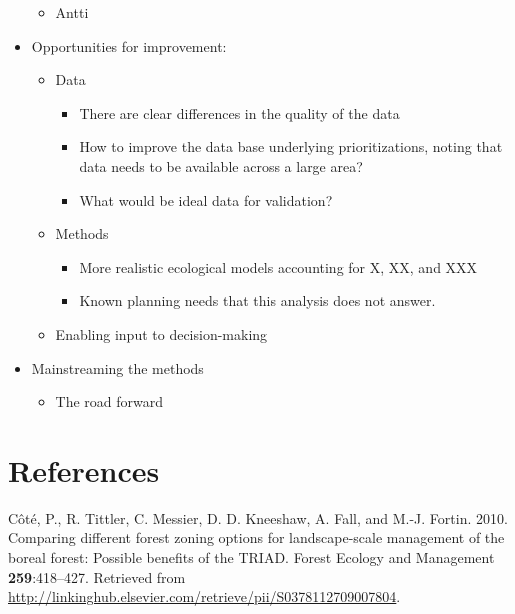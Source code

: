 \documentclass[]{article}
\begin{document}
\begin{itemize}
  \begin{itemize}
  \itemsep1pt\parskip0pt
  \item
    Antti
  \end{itemize}
\item
  Opportunities for improvement:

  \begin{itemize}
  \itemsep1pt\parskip0pt
  \item
    Data

    \begin{itemize}
    \itemsep1pt\parskip0pt
    \item
      There are clear differences in the quality of the data
    \item
      How to improve the data base underlying prioritizations, noting
      that data needs to be available across a large area?
    \item
      What would be ideal data for validation?
    \end{itemize}
  \item
    Methods

    \begin{itemize}
    \itemsep1pt\parskip0pt
    \item
      More realistic ecological models accounting for X, XX, and XXX
    \item
      Known planning needs that this analysis does not answer.
    \end{itemize}
  \item
    Enabling input to decision-making
  \end{itemize}
\item
  Mainstreaming the methods

  \begin{itemize}
  \itemsep1pt\parskip0pt
  \item
    The road forward
  \end{itemize}
\end{itemize}

\section{References}

Côté, P., R. Tittler, C. Messier, D. D. Kneeshaw, A. Fall, and M.-J.
Fortin. 2010. Comparing different forest zoning options for
landscape-scale management of the boreal forest: Possible benefits of
the TRIAD. Forest Ecology and Management \textbf{259}:418--427.
Retrieved from
\url{http://linkinghub.elsevier.com/retrieve/pii/S0378112709007804}.
\end{document}
